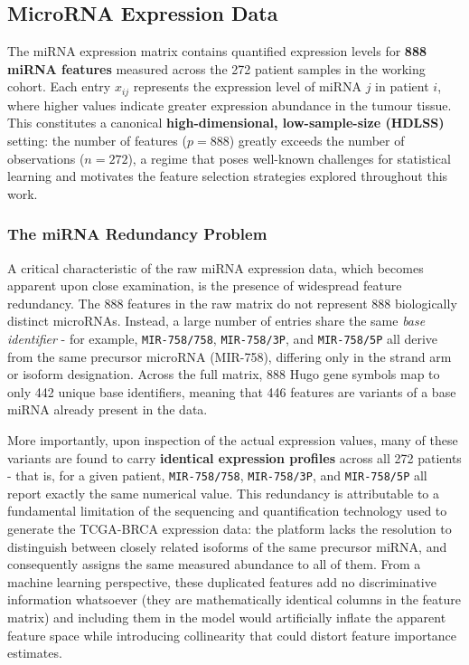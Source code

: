 \subsection{MicroRNA Expression Data}
\label{subsec:mirna_data}

The miRNA expression matrix contains quantified expression levels for
\textbf{888 miRNA features} measured across the 272 patient samples in the
working cohort. Each entry $x_{ij}$ represents the expression level of
miRNA $j$ in patient $i$, where higher values indicate greater expression
abundance in the tumour tissue. This constitutes a canonical
\textbf{high-dimensional, low-sample-size (HDLSS)} setting: the number of
features ($p = 888$) greatly exceeds the number of observations ($n = 272$),
a regime that poses well-known challenges for statistical learning and motivates
the feature selection strategies explored throughout this work. 

\subsubsection*{The miRNA Redundancy Problem}

A critical characteristic of the raw miRNA expression data, which becomes
apparent upon close examination, is the presence of widespread feature
redundancy. The 888 features in the raw matrix do not represent 888
biologically distinct microRNAs. Instead, a large number of entries share the
same \textit{base identifier} - for example, \texttt{MIR-758/758},
\texttt{MIR-758/3P}, and \texttt{MIR-758/5P} all derive from the same
precursor microRNA (MIR-758), differing only in the strand arm or isoform
designation. Across the full matrix, 888 Hugo gene symbols map to only 442
unique base identifiers, meaning that 446 features are variants of a base
miRNA already present in the data.

More importantly, upon inspection of the actual expression values, many of
these variants are found to carry \textbf{identical expression profiles} across
all 272 patients - that is, for a given patient, \texttt{MIR-758/758},
\texttt{MIR-758/3P}, and \texttt{MIR-758/5P} all report exactly the same
numerical value. This redundancy is attributable to a fundamental limitation of
the sequencing and quantification technology used to generate the TCGA-BRCA
expression data: the platform lacks the resolution to distinguish between
closely related isoforms of the same precursor miRNA, and consequently assigns
the same measured abundance to all of them. From a machine learning perspective,
these duplicated features add no discriminative information whatsoever (they
are mathematically identical columns in the feature matrix) and including
them in the model would artificially inflate the apparent feature space while
introducing collinearity that could distort feature importance estimates.


